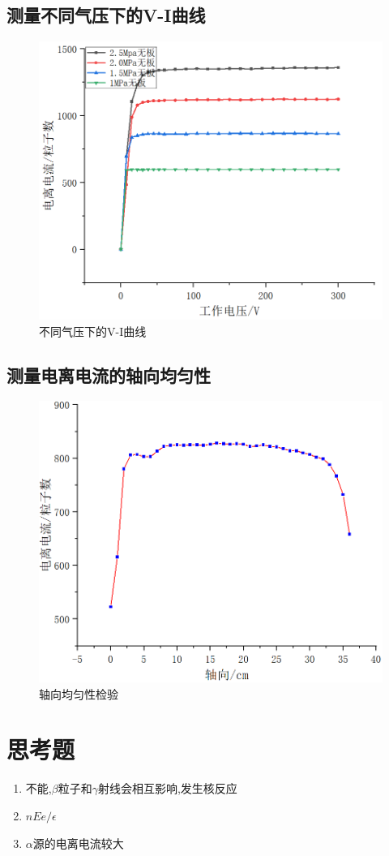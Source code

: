 \documentclass{article}
\begin{document}
    \subsection{测量不同气压下的V-I曲线}
    \begin{figure}[htbp]
        \centering
        \includegraphics[scale=0.5]{img/1.png}
        \caption{不同气压下的V-I曲线}
    \end{figure}

    \subsection{测量电离电流的轴向均匀性}
    \begin{figure}[htbp]
        \centering
        \includegraphics[scale=0.5]{img/3.png}
        \caption{轴向均匀性检验}
    \end{figure}
    \section{思考题}
    \begin{enumerate}
        \item 不能,$\beta$粒子和$\gamma$射线会相互影响,发生核反应
        \item $nEe/ \epsilon$
        \item $\alpha$源的电离电流较大
    \end{enumerate}
\end{document}
